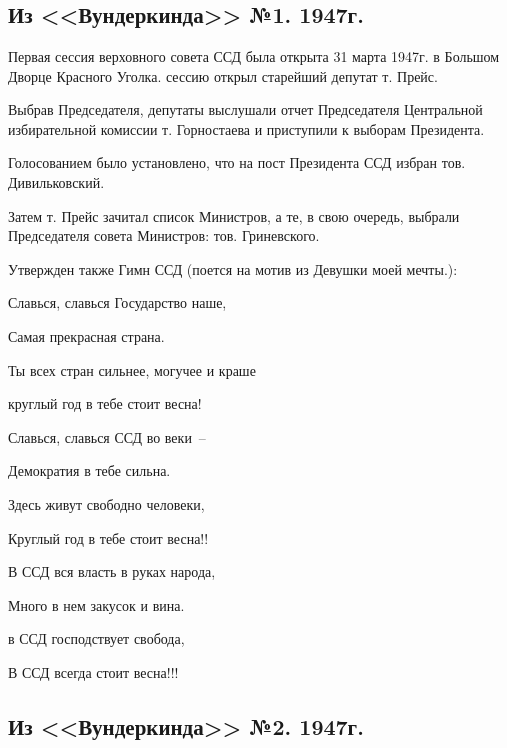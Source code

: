 \chapter{}

\section*{Из <<Вундеркинда>> №1. 1947г.}

Первая сессия верховного совета ССД была открыта 31 марта 1947г. в Большом Дворце Красного Уголка. сессию открыл старейший депутат т. Прейс.

Выбрав Председателя, депутаты выслушали отчет Председателя Центральной избирательной комиссии т.  Горностаева и приступили к выборам Президента.

Голосованием было установлено, что на пост Президента ССД избран тов. Дивильковский.

Затем т. Прейс зачитал список Министров, а те, в свою очередь, выбрали Председателя совета Министров: тов. Гриневского.

Утвержден также Гимн ССД (поется на мотив из Девушки моей мечты.):

\vfill

{\itshape

Славься, славься Государство наше,

Самая прекрасная страна.

Ты всех стран сильнее, могучее и краше

круглый год в тебе стоит весна!

\vfill

Славься, славься ССД во веки~--

Демократия в тебе сильна.

Здесь живут свободно человеки,

Круглый год в тебе стоит весна!!

\vfill

В ССД вся власть в руках народа,

Много в нем закусок и вина.

в ССД господствует свобода,

В ССД всегда стоит весна!!!

}


\section*{Из <<Вундеркинда>> №2. 1947г.}

